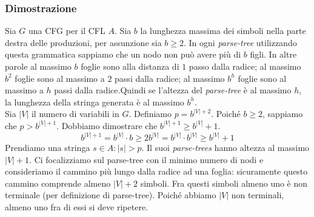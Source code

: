 \documentclass[italian]{article}
\newcommand{\len}[1]{\text{$|#1|$}}
\begin{document}
	\subsubsection{Dimostrazione}
	Sia $G$ una CFG per il CFL $A$. Sia $b$ la lunghezza massima dei simboli nella parte destra delle produzioni, per assunzione sia $b \geq 2$. In ogni \textit{parse-tree} utilizzando questa grammatica sappiamo che un nodo non può avere più di $b$ figli. In altre parole al massimo $b$ foglie sono alla distanza di $1$ passo dalla radice; al massimo $b^2$ foglie sono al massimo a $2$ passi dalla radice; al massimo $b^h$ foglie sono al massimo a $h$ passi dalla radice.Quindi se l'altezza del \textit{parse-tree} è al massimo $h$, la lunghezza della stringa generata è al massimo $b^h$. \\
	Sia $\len{V}$ il numero di variabili in $G$. Definiamo $p = b^{\len{V}+2}$. Poiché $b \geq 2$, sappiamo che $p > b^{\len{V}+1}$. Dobbiamo dimostrare che $b^{\len{V}+1} \geq b^{\len{V}}+1$.
	\[
		b^{\len{V}+1} = b^{\len{V}}\cdot b \geq 2b^{\len{V}} = b^{\len{V}} \cdot b^{\len{V}} \geq b^{\len{V}} + 1
	\]
	Prendiamo una stringa $s \in A : \len{s} > p$. Il suoi \textit{parse-trees} hanno altezza al massimo $\len{V} + 1$. Ci focalizziamo sul parse-tree con il minimo numero di nodi e consideriamo il cammino più lungo dalla radice ad una foglia: sicuramente questo cammino comprende almeno $\len{V} + 2$ simboli. Fra questi simboli almeno uno è non terminale (per definizione di parse-tree). Poiché abbiamo $\len{V}$ non terminali, almeno uno fra di essi si deve ripetere.
	

	
\end{document}
